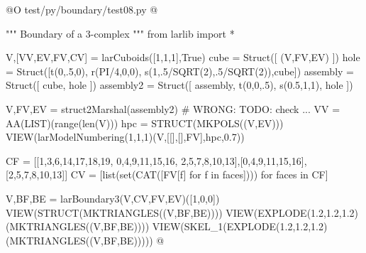 \documentclass[11pt,oneside]{article}	%
\begin{document}
@O test/py/boundary/test08.py
@{""" Boundary of a 3-complex """
from larlib import *

V,[VV,EV,FV,CV] = larCuboids([1,1,1],True)
cube = Struct([ (V,FV,EV) ])
hole = Struct([t(0,.5,0), r(PI/4,0,0), s(1,.5/SQRT(2),.5/SQRT(2)),cube])
assembly = Struct([ cube, hole ])
assembly2 = Struct([ assembly, t(0,0,.5), s(0.5,1,1), hole ])

V,FV,EV = struct2Marshal(assembly2) # WRONG:  TODO: check ...
VV = AA(LIST)(range(len(V)))
hpc = STRUCT(MKPOLS((V,EV)))
VIEW(larModelNumbering(1,1,1)(V,[[],[],FV],hpc,0.7))

CF = [[1,3,6,14,17,18,19, 0,4,9,11,15,16, 2,5,7,8,10,13],[0,4,9,11,15,16],[2,5,7,8,10,13]]
CV = [list(set(CAT([FV[f]  for f in faces]))) for faces in CF]

V,BF,BE = larBoundary3(V,CV,FV,EV)([1,0,0])
VIEW(STRUCT(MKTRIANGLES((V,BF,BE)))) 
VIEW(EXPLODE(1.2,1.2,1.2)(MKTRIANGLES((V,BF,BE)))) 
VIEW(SKEL_1(EXPLODE(1.2,1.2,1.2)(MKTRIANGLES((V,BF,BE)))))
@}
\end{document}
